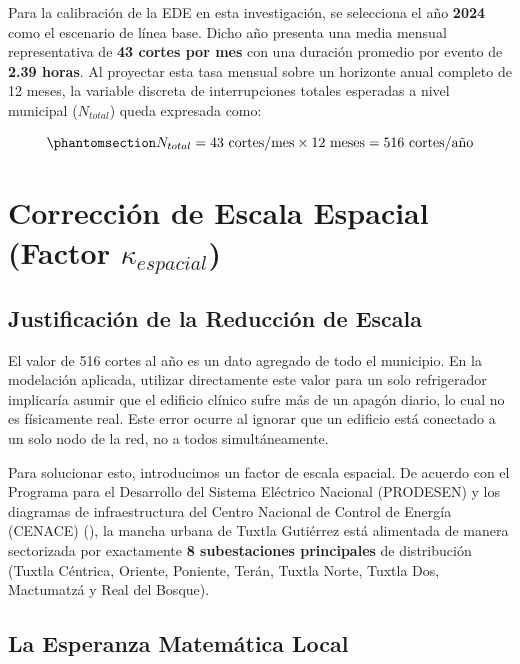 \documentclass[
  spanish,
  letterpaper,
  DIV=11,
  numbers=noendperiod]{scrreprt}
\theoremstyle{plain}
\theoremstyle{definition}
\theoremstyle{remark}
\begin{document}
Para la calibración de la EDE en esta investigación, se selecciona el
año \textbf{2024} como el escenario de línea base. Dicho año presenta
una media mensual representativa de \textbf{43 cortes por mes} con una
duración promedio por evento de \textbf{2.39 horas}. Al proyectar esta
tasa mensual sobre un horizonte anual completo de 12 meses, la variable
discreta de interrupciones totales esperadas a nivel municipal
(\(N_{total}\)) queda expresada como:

\begin{equation}\phantomsection\label{eq-cortes-totales}{
N_{total} = 43 \text{ cortes/mes} \times 12 \text{ meses} = 516 \text{ cortes/año}
}\end{equation}

\section{\texorpdfstring{Corrección de Escala Espacial (Factor
\(\kappa_{espacial}\))}{Corrección de Escala Espacial (Factor \textbackslash kappa\_\{espacial\})}}\label{correcciuxf3n-de-escala-espacial-factor-kappa_espacial}

\subsection{Justificación de la Reducción de
Escala}\label{justificaciuxf3n-de-la-reducciuxf3n-de-escala}

El valor de 516 cortes al año es un dato agregado de todo el municipio.
En la modelación aplicada, utilizar directamente este valor para un solo
refrigerador implicaría asumir que el edificio clínico sufre más de un
apagón diario, lo cual no es físicamente real. Este error ocurre al
ignorar que un edificio está conectado a un solo nodo de la red, no a
todos simultáneamente.

Para solucionar esto, introducimos un factor de escala espacial. De
acuerdo con el Programa para el Desarrollo del Sistema Eléctrico
Nacional (PRODESEN) y los diagramas de infraestructura del Centro
Nacional de Control de Energía (CENACE)
(), la
mancha urbana de Tuxtla Gutiérrez está alimentada de manera sectorizada
por exactamente \textbf{8 subestaciones principales} de distribución
(Tuxtla Céntrica, Oriente, Poniente, Terán, Tuxtla Norte, Tuxtla Dos,
Mactumatzá y Real del Bosque).

\subsection{La Esperanza Matemática
Local}\label{la-esperanza-matemuxe1tica-local}
\end{document}
